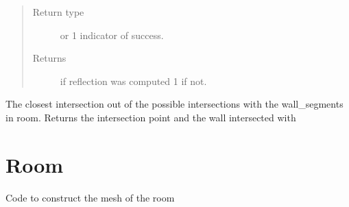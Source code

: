 \documentclass[letterpaper,10pt,english]{sphinxmanual}
\begin{document}
\begin{fulllineitems}
\begin{fulllineitems}
\begin{itemize}
\begin{itemize}
\end{itemize}

\end{itemize}
\begin{quote}\begin{description}
\item[{Return type}]  or 1 indicator of success.

\item[{Returns}]  if  reflection was computed 1 if not.

\end{description}\end{quote}

\end{fulllineitems}


\begin{fulllineitems}
\label{index:Rays.Ray.room_collision_point}
The closest intersection out of the possible intersections with
the wall\_segments in room. Returns the intersection point and the
wall intersected with

\end{fulllineitems}


\end{fulllineitems}



\chapter{Room}
\label{index:room}\label{index:module-Room}
Code to construct the mesh of the room
\end{document}
